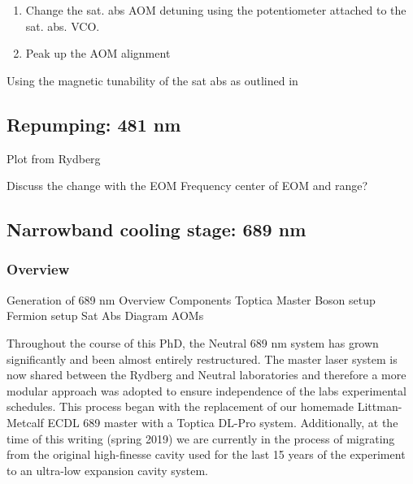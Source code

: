 \begin{enumerate}
\item Change the sat. abs AOM detuning using the potentiometer attached to the sat. abs. VCO. 
\item Peak up the AOM alignment

\end{enumerate}

Using the magnetic tunability of the sat abs as outlined in 

\subsection{Repumping: 481 nm}
\label{ssec:481sys}

Plot from Rydberg

Discuss the change with the EOM
	Frequency center of EOM and range?


\subsection{Narrowband cooling stage: 689 nm} \label{ssec:689sys}
\subsubsection{Overview}

Generation of 689 nm
	Overview
	Components
		Toptica Master
		Boson setup
		Fermion setup
		Sat Abs
	Diagram
		AOMs
	
Throughout the course of this PhD, the Neutral 689 nm system has grown significantly and been almost entirely restructured. The master laser system is now shared between the Rydberg and Neutral laboratories and therefore a more modular approach was adopted to ensure independence of the labs experimental schedules. This process began with the replacement of our homemade Littman-Metcalf ECDL 689 master with a Toptica DL-Pro system. Additionally, at the time of this writing (spring 2019) we are currently in the process of migrating from the original high-finesse cavity used for the last 15 years \cite{Nagel2004} of the experiment to an ultra-low expansion cavity system. 

